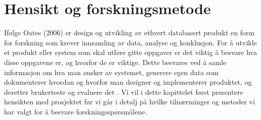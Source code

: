 \chapter{Hensikt og forskningsmetode}
\label{chp:forskningsmetode}


\noindent
Ifølge Oates (2006) er design og utvikling av ethvert databasert produkt en form for forskning som krever innsamling av data, analyse og konklusjon. For å utvikle et produkt eller system som skal utføre gitte oppgaver er det viktig å besvare hva disse oppgavene er, og hvorfor de er viktige. Dette besvares ved å samle informasjon om hva man ønsker av systemet, generere egen data som dokumenterer hvordan og hvorfor man designer og implementerer produktet, og deretter brukerteste og evaluere det \cite{Oates}. Vi vil i dette kapittelet først presentere hensikten med prosjektet før vi går i detalj på hvilke tilnærminger og metoder vi har valgt for å besvare forskningsspørsmålene.

